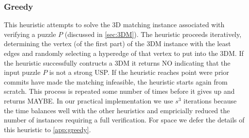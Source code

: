 \documentclass[11pt]{article}
\begin{document}



\subsubsection{Greedy}

This heuristic attempts to solve the 3D matching instance associated
with verifying a puzzle $P$ (discussed in \autoref{sec:3DM}).  The
heuristic proceeds iteratively, determining the vertex (of the first
part) of the 3DM instance with the least edges and randomly selecting
a hyperedge of that vertex to put into the 3DM.  If the heuristic
successfully contructs a 3DM it returns NO indicating that the input
puzzle $P$ is not a strong USP.  If the heuristic reaches point were
prior commits have made the matching infeasible, the heuristic starts
again from scratch.  This process is repeated some number of times
before it gives up and returns MAYBE.  In our practical implementation
we use $s^3$ iterations because the time balances well with the other
heuristics and empricially reduced the number of instances requiring a
full verification.  For space we defer the details of this heuristic
to \autoref{app:greedy}.




\end{document}

